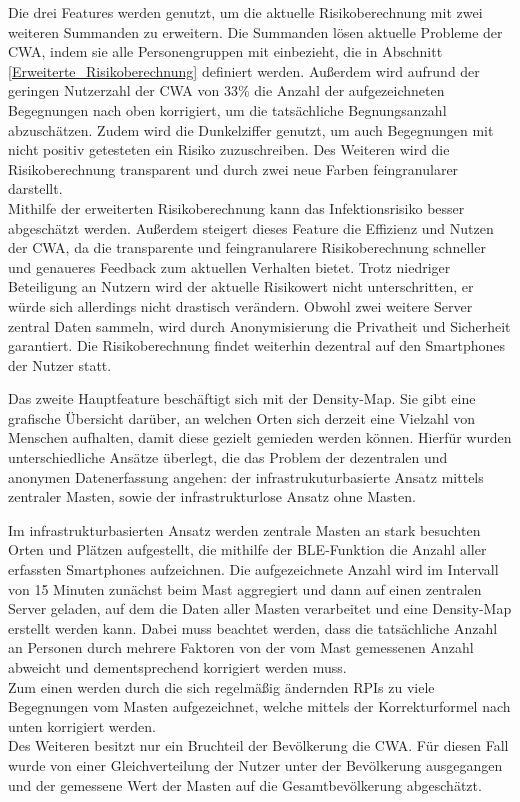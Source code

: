 \documentclass[conference,compsoc]{IEEEtran}
\begin{document}
Die drei Features werden genutzt, um die aktuelle Risikoberechnung mit zwei weiteren Summanden zu erweitern.
Die Summanden lösen aktuelle Probleme der CWA, indem sie alle Personengruppen mit einbezieht, die in Abschnitt \ref{Erweiterte_Risikoberechnung} definiert werden.
Außerdem wird aufrund der geringen Nutzerzahl der CWA von 33\% die Anzahl der aufgezeichneten Begegnungen nach oben korrigiert, um die tatsächliche Begnungsanzahl abzuschätzen. 
Zudem wird die Dunkelziffer genutzt, um auch Begegnungen mit nicht positiv getesteten ein Risiko zuzuschreiben.
Des Weiteren wird die Risikoberechnung transparent und durch zwei neue Farben feingranularer darstellt.\\
Mithilfe der erweiterten Risikoberechnung kann das Infektionsrisiko besser abgeschätzt werden.
Außerdem steigert dieses Feature die Effizienz und Nutzen der CWA, da die transparente und feingranularere Risikoberechnung schneller und genaueres Feedback zum aktuellen Verhalten bietet. 
Trotz niedriger Beteiligung an Nutzern wird der aktuelle Risikowert nicht unterschritten, er würde sich allerdings nicht drastisch verändern.
Obwohl zwei weitere Server zentral Daten sammeln, wird durch Anonymisierung die Privatheit und Sicherheit garantiert.
Die Risikoberechnung findet weiterhin dezentral auf den Smartphones der Nutzer statt. 

Das zweite Hauptfeature beschäftigt sich mit der Density-Map. 
Sie gibt eine grafische Übersicht darüber, an welchen Orten sich derzeit eine Vielzahl von Menschen aufhalten, damit diese gezielt gemieden werden können. 
Hierfür wurden unterschiedliche Ansätze überlegt, die das Problem der dezentralen und anonymen Datenerfassung angehen: 
der infrastrukuturbasierte Ansatz mittels zentraler Masten, sowie der infrastrukturlose Ansatz ohne Masten. 

Im infrastrukturbasierten Ansatz werden zentrale Masten an stark besuchten Orten und Plätzen aufgestellt, die mithilfe der BLE-Funktion die Anzahl aller erfassten Smartphones aufzeichnen.
Die aufgezeichnete Anzahl wird im Intervall von 15 Minuten zunächst beim Mast aggregiert und dann auf einen zentralen Server geladen, auf dem die Daten aller Masten verarbeitet und eine Density-Map erstellt werden kann.
Dabei muss beachtet werden, dass die tatsächliche Anzahl an Personen durch mehrere Faktoren von der vom Mast gemessenen Anzahl abweicht und dementsprechend korrigiert werden muss.\\
Zum einen werden durch die sich regelmäßig ändernden RPIs zu viele Begegnungen vom Masten aufgezeichnet, welche mittels der Korrekturformel nach unten korrigiert werden.\\
Des Weiteren besitzt nur ein Bruchteil der Bevölkerung die CWA. Für diesen Fall wurde von einer Gleichverteilung der Nutzer unter der Bevölkerung ausgegangen und der gemessene Wert der Masten auf die Gesamtbevölkerung abgeschätzt.
\end{document}
